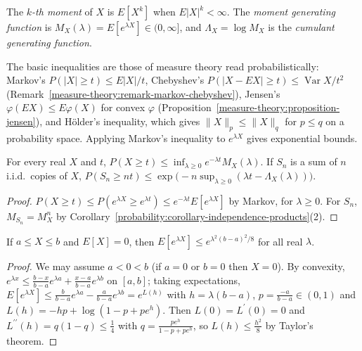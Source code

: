 \begin{definition}\label{probability:definition-moments}
The \emph{$k$-th moment} of $X$ is $E[X^k]$ when $E|X|^k < \infty$. The \emph{moment generating function} is $M_X(\lambda) = E[e^{\lambda X}] \in (0, \infty]$, and $\Lambda_X = \log M_X$ is the \emph{cumulant generating function}.
\end{definition}

The basic inequalities are those of measure theory read probabilistically: Markov's $P(|X| \geq t) \leq E|X|/t$, Chebyshev's $P(|X - EX| \geq t) \leq \operatorname{Var}X/t^2$ (Remark~\ref{measure-theory:remark-markov-chebyshev}),
Jensen's $\varphi(EX) \leq E\varphi(X)$ for convex $\varphi$ (Proposition~\ref{measure-theory:proposition-jensen}), and H\"older's inequality, which gives $\|X\|_p \leq \|X\|_q$ for $p \leq q$ on a probability space. Applying
Markov's inequality to $e^{\lambda X}$ gives exponential bounds.

\begin{proposition}\label{probability:proposition-chernoff}
For every real $X$ and $t$, $P(X \geq t) \leq \inf_{\lambda \geq 0}e^{-\lambda t}M_X(\lambda)$. If $S_n$ is a sum of $n$ i.i.d.\ copies of $X$, $P(S_n \geq nt) \leq \exp\bigl(-n\sup_{\lambda \geq 0}(\lambda t - \Lambda_X(\lambda))\bigr)$.
\end{proposition}

\begin{proof}
$P(X \geq t) \leq P(e^{\lambda X} \geq e^{\lambda t}) \leq e^{-\lambda t}E[e^{\lambda X}]$ by Markov, for $\lambda \geq 0$. For $S_n$, $M_{S_n} = M_X^n$ by Corollary~\ref{probability:corollary-independence-products}(2).
\end{proof}

\begin{lemma}[Hoeffding]\label{probability:lemma-hoeffding}
If $a \leq X \leq b$ and $E[X] = 0$, then $E[e^{\lambda X}] \leq e^{\lambda^2(b - a)^2/8}$ for all real $\lambda$.
\end{lemma}

\begin{proof}
We may assume $a < 0 < b$ (if $a = 0$ or $b = 0$ then $X = 0$). By convexity, $e^{\lambda x} \leq \frac{b - x}{b - a}e^{\lambda a} + \frac{x - a}{b - a}e^{\lambda b}$ on $[a, b]$; taking expectations,
$E[e^{\lambda X}] \leq \frac{b}{b - a}e^{\lambda a} - \frac{a}{b - a}e^{\lambda b} = e^{L(h)}$ with $h = \lambda(b - a)$, $p = \frac{-a}{b - a} \in (0, 1)$ and $L(h) = -hp + \log(1 - p + pe^h)$. Then $L(0) = L^{\prime}(0) = 0$ and
$L^{\prime\prime}(h) = q(1 - q) \leq \frac14$ with $q = \frac{pe^h}{1 - p + pe^h}$, so $L(h) \leq \frac{h^2}{8}$ by Taylor's theorem.
\end{proof}


